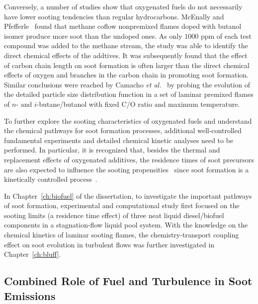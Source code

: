 Conversely, a number of studies show that oxygenated fuels do not necessarily have lower sooting tendencies than regular hydrocarbons.  McEnally and Pfefferle~\cite{mcenally05,mcenally11} found that methane coflow nonpremixed flames doped with butanol isomer produce more soot than the undoped ones.  As only $1000$ ppm of each test compound was added to the methane stream, the study was able to identify the direct chemical effects of the addtives.  It was subsequently found that the effect of carbon chain length on soot formation is often larger than the direct chemical effects of oxygen and branches in the carbon chain in promoting soot formation.  Similar conclusions were reached by Camacho \emph{et al.}~\cite{camacho13} by probing the evolution of the detailed particle size distribution function in a set of laminar premixed flames of $n$- and $i$-butane/butanol with fixed C/O ratio and maximum temperature. 

To further explore the sooting characteristics of oxygenated fuels and understand the chemical pathways for soot formation processes, additional well-controlled fundamental experiments and detailed chemical kinetic analyses need to be performed.  In particular, it is recognized that, besides the thermal and replacement effects of oxygenated additives, the residence times of soot precursors are also expected to influence the sooting propensities~\cite{tsuji71,wang14} since soot formation is a kinetically controlled process~\cite{vandsburger85}.

In Chapter~\ref{ch:biofuel} of the dissertation, to investigate the important pathways of soot formation, experimental and computational study first focused on the sooting limits (a residence time effect) of three neat liquid diesel/biofuel components in a stagnation-flow liquid pool system.  With the knowledge on the chemical kinetics of laminar sooting flames, the chemistry-transport coupling effect on soot evolution in turbulent flows was further investigated in Chapter~\ref{ch:bluff}. 

\subsection{Combined Role of Fuel and Turbulence in Soot Emissions}\label{sec:intro-bluff}


